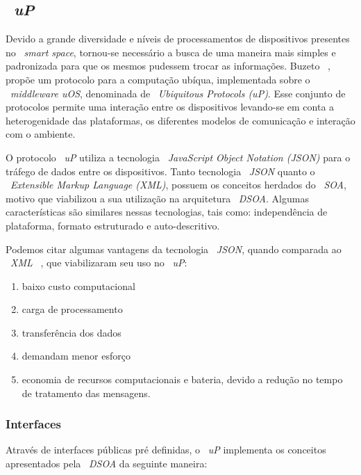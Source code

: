 \subsection{~\textit{uP}}
\label{sec:up}


	Devido a grande diversidade e níveis de processamentos de dispositivos presentes no ~\textit{smart
	space}, tornou-se necessário a busca de uma maneira mais simples e padronizada para que os mesmos
	pudessem trocar as informações. Buzeto ~\cite{uos},	propõe um protocolo para a computação ubíqua,
	implementada sobre o ~\textit{middleware uOS}, denominada de ~\textit{Ubiquitous Protocols (uP)}.
	Esse conjunto de protocolos permite uma interação entre os dispositivos levando-se em conta a
	heterogenidade das plataformas, os diferentes modelos de comunicação e interação com o ambiente.
	
	O protocolo ~\textit{uP} utiliza a tecnologia ~\textit{JavaScript Object Notation (JSON)} para o
	tráfego de dados entre os dispositivos. Tanto tecnologia ~\textit{JSON} quanto o
	~\textit{Extensible Markup Language (XML)}, possuem os conceitos herdados do ~\textit{SOA}, motivo
	que viabilizou a sua utilização na arquitetura ~\textit{DSOA}. Algumas características são
	similares nessas tecnologias, tais como:  independência de plataforma, formato estruturado e
	auto-descritivo.
	
	Podemos citar algumas vantagens da tecnologia ~\textit{JSON}, quando comparada ao ~\textit{XML}
	~\cite{enokiFreitas}, que viabilizaram seu uso no ~\textit{uP}:

		\begin{enumerate}
		  \item baixo custo computacional
          \item carga de processamento
          \item transferência dos dados
          \item demandam menor esforço
          \item economia de recursos computacionais e bateria, devido a redução no tempo de
          tratamento das mensagens.
		\end{enumerate}
 
	
	
	\subsubsection{Interfaces}
	
	Através de interfaces públicas pré definidas, o ~\textit{uP} implementa os conceitos apresentados
	pela ~\textit{DSOA} da seguinte maneira:
	
